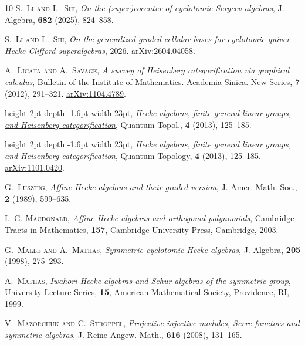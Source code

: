 \documentclass[a4paper,11pt]{amsart}
\numberwithin{equation}{subsection}
\theoremstyle{definition}
\theoremstyle{theorem}
\theoremstyle{remark}
\begin{document}
\begin{thebibliography}{10}
\textsc{S.~Li and L.~Shi}, \textit{On the (super)cocenter of cyclotomic
  {S}ergeev algebras}, J. Algebra, \textbf{682} (2025), 824--858.

\textsc{S.~Li and L.~Shi}, \href{https://arxiv.org/abs/2604.04058}{\textit{On
  the generalized graded cellular bases for cyclotomic quiver Hecke-Clifford
  superalgebras}}, 2026.
\newblock \href{http://arxiv.org/abs/2604.04058}{arXiv:2604.04058}.

\textsc{A.~Licata and A.~Savage}, \textit{A survey of {H}eisenberg
  categorification via graphical calculus}, Bulletin of the Institute of
  Mathematics. Academia Sinica. New Series, \textbf{7} (2012), 291--321.
\newblock \href{http://arxiv.org/abs/1104.4789}{arXiv:1104.4789}.

\leavevmode\vrule height 2pt depth -1.6pt width 23pt,
  \href{http://dx.doi.org/10.4171/QT/37}{\textit{Hecke algebras, finite general
  linear groups, and {H}eisenberg categorification}}, Quantum Topol.,
  \textbf{4} (2013), 125--185.

\leavevmode\vrule height 2pt depth -1.6pt width 23pt, \textit{Hecke algebras,
  finite general linear groups, and {H}eisenberg categorification}, Quantum
  Topology, \textbf{4} (2013), 125--185.
\newblock \href{http://arxiv.org/abs/1101.0420}{arXiv:1101.0420}.

\textsc{G.~Lusztig}, \href{http://dx.doi.org/10.2307/1990945}{\textit{Affine
  {H}ecke algebras and their graded version}}, J. Amer. Math. Soc., \textbf{2}
  (1989), 599--635.

\textsc{I.~G. Macdonald},
  \href{http://dx.doi.org/10.1017/CBO9780511542824}{\textit{Affine {H}ecke
  algebras and orthogonal polynomials}}, Cambridge Tracts in Mathematics,
  \textbf{157}, Cambridge University Press, Cambridge, 2003.

\textsc{G.~Malle and A.~Mathas}, \textit{Symmetric cyclotomic {H}ecke
  algebras}, J. Algebra, \textbf{205} (1998), 275--293.

\textsc{A.~Mathas},
  \href{http://dx.doi.org/10.1090/ulect/015}{\textit{Iwahori-{H}ecke algebras
  and {S}chur algebras of the symmetric group}}, University Lecture Series,
  \textbf{15}, American Mathematical Society, Providence, RI, 1999.

\textsc{V.~Mazorchuk and C.~Stroppel},
  \href{http://dx.doi.org/10.1515/CRELLE.2008.020}{\textit{Projective-injective
  modules, {S}erre functors and symmetric algebras}}, J. Reine Angew. Math.,
  \textbf{616} (2008), 131--165.


\end{thebibliography}
\end{document}
